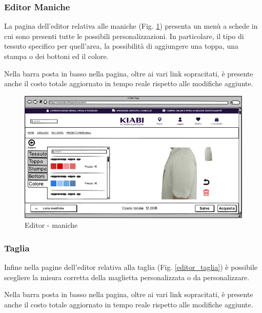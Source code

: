 \documentclass[12pt,italian,]{report}
\begin{document}
\newpage
\subsubsection{Editor Maniche} 

La pagina dell'editor relativa alle maniche (Fig. \ref{editor_maniche}) presenta un menù a schede in cui sono presenti tutte le possibili personalizzazioni. In particolare, il tipo di tessuto specifico per quell'area, la possibilità di aggiungere una toppa, una stampa o dei bottoni ed il colore.

Nella barra posta in basso nella pagina, oltre ai vari link sopracitati, è presente anche il costo totale aggiornato in tempo reale rispetto alle modifiche aggiunte.

\begin{figure}[h]
\centering
\includegraphics{balsamiq/Editor - caratteristica maniche colore.png}
\caption{Editor - maniche}
\label{editor_maniche}
\end{figure}

\newpage
\subsubsection{Taglia} 

Infine nella pagine dell'editor relativa alla taglia (Fig. \ref{editor_taglia}) è possibile scegliere la misura corretta della maglietta personalizzata o da personalizzare.

Nella barra posta in basso nella pagina, oltre ai vari link sopracitati, è presente anche il costo totale aggiornato in tempo reale rispetto alle modifiche aggiunte.
\end{document}
